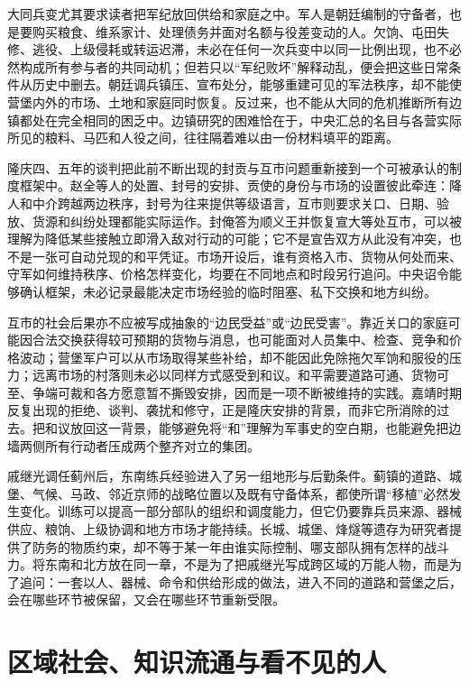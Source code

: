 大同兵变尤其要求读者把军纪放回供给和家庭之中。军人是朝廷编制的守备者，也是要购买粮食、维系家计、处理债务并面对名额与役差变动的人。欠饷、屯田失修、逃役、上级侵耗或转运迟滞，未必在任何一次兵变中以同一比例出现，也不必然构成所有参与者的共同动机；但若只以“军纪败坏”解释动乱，便会把这些日常条件从历史中删去。朝廷调兵镇压、宣布处分，能够重建可见的军法秩序，却不能使营堡内外的市场、土地和家庭同时恢复。反过来，也不能从大同的危机推断所有边镇都处在完全相同的困乏中。边镇研究的困难恰在于，中央汇总的名目与各营实际所见的粮料、马匹和人役之间，往往隔着难以由一份材料填平的距离。

隆庆四、五年的谈判把此前不断出现的封贡与互市问题重新接到一个可被承认的制度框架中。赵全等人的处置、封号的安排、贡使的身份与市场的设置彼此牵连：降人和中介跨越两边秩序，封号为往来提供等级语言，互市则要求关口、日期、验放、货源和纠纷处理都能实际运作。封俺答为顺义王并恢复宣大等处互市，可以被理解为降低某些接触立即滑入敌对行动的可能；它不是宣告双方从此没有冲突，也不是一张可自动兑现的和平凭证。市场开设后，谁有资格入市、货物从何处而来、守军如何维持秩序、价格怎样变化，均要在不同地点和时段另行追问。中央诏令能够确认框架，未必记录最能决定市场经验的临时阻塞、私下交换和地方纠纷。

互市的社会后果亦不应被写成抽象的“边民受益”或“边民受害”。靠近关口的家庭可能因合法交换获得较可预期的货物与消息，也可能面对人员集中、检查、竞争和价格波动；营堡军户可以从市场取得某些补给，却不能因此免除拖欠军饷和服役的压力；远离市场的村落则未必以同样方式感受到和议。和平需要道路可通、货物可至、争端可裁和各方愿意暂不撕毁安排，因而是一项不断被维持的实践。嘉靖时期反复出现的拒绝、谈判、袭扰和修守，正是隆庆安排的背景，而非它所消除的过去。把和议放回这一背景，能够避免将“和”理解为军事史的空白期，也能避免把边墙两侧所有行动者压成两个整齐对立的集团。

戚继光调任蓟州后，东南练兵经验进入了另一组地形与后勤条件。蓟镇的道路、城堡、气候、马政、邻近京师的战略位置以及既有守备体系，都使所谓“移植”必然发生变化。训练可以提高一部分部队的组织和调度能力，但它仍要靠兵员来源、器械供应、粮饷、上级协调和地方市场才能持续。长城、城堡、烽燧等遗存为研究者提供了防务的物质约束，却不等于某一年由谁实际控制、哪支部队拥有怎样的战斗力。将东南和北方放在同一章，不是为了把戚继光写成跨区域的万能人物，而是为了追问：一套以人、器械、命令和供给形成的做法，进入不同的道路和营堡之后，会在哪些环节被保留，又会在哪些环节重新受限。

\section{区域社会、知识流通与看不见的人}

